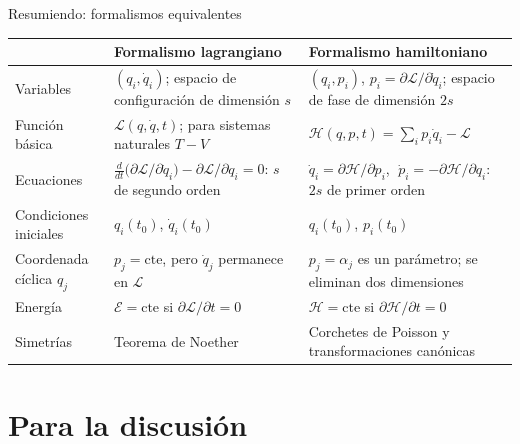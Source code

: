 \documentclass[spanish]{beamer}
\newcommand{\Lag}{\mathcal{L}}               %
\newcommand{\Ham}{\mathcal{H}}               %
\newcommand{\Ene}{\mathcal{E}}               %
\newcommand{\cte}{\text{cte}}
\begin{document}
\begin{frame}{Resumiendo: formalismos equivalentes}
\scriptsize
\renewcommand{\arraystretch}{1.5}
\begin{tabular}{@{}>{\raggedright}p{}>{\raggedright}p{}>{\raggedright\arraybackslash}p{}@{}}
  \toprule
  & \textbf{Formalismo lagrangiano} & \textbf{Formalismo hamiltoniano} \\
  \midrule
  Variables & $(q_i,\dot q_i)$; espacio de configuración de dimensión $s$
            & $(q_i,p_i)$, $p_i=\partial\Lag/\partial\dot q_i$; espacio de fase de dimensión $2s$ \\
  Función básica & $\Lag(q,\dot q,t)$; para sistemas naturales $T-V$
                 & $\Ham(q,p,t)=\sum_i p_i\dot q_i-\Lag$ \\
  Ecuaciones & $\frac{d}{dt}\big(\partial\Lag/\partial\dot q_i\big)-\partial\Lag/\partial q_i=0$:
               $s$ de segundo orden
             & $\dot q_i=\partial\Ham/\partial p_i$, $\;\dot p_i=-\partial\Ham/\partial q_i$:
               $2s$ de primer orden \\
  Condiciones iniciales & $q_i(t_0)$, $\dot q_i(t_0)$ & $q_i(t_0)$, $p_i(t_0)$ \\
  Coordenada cíclica $q_j$ & $p_j=\cte$, pero $\dot q_j$ permanece en $\Lag$
                           & $p_j=\alpha_j$ es un parámetro; se eliminan dos dimensiones \\
  Energía & $\Ene=\cte$ si $\partial\Lag/\partial t=0$ & $\Ham=\cte$ si $\partial\Ham/\partial t=0$ \\
  Simetrías & Teorema de Noether & Corchetes de Poisson y transformaciones canónicas \\
  \bottomrule
\end{tabular}
\end{frame}

\section{Para la discusión}
\end{document}
